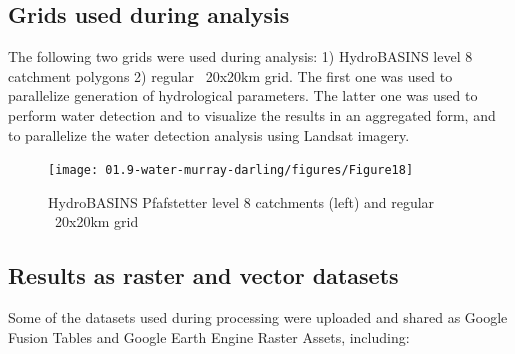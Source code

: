 \subsection{Grids used during analysis}

The following two grids were used during analysis: 1) HydroBASINS level 8 catchment polygons 2) regular ~20x20km grid. The first one was used to parallelize generation of hydrological parameters. The latter one was used to perform water detection and to visualize the results in an aggregated form, and to parallelize the water detection analysis using Landsat imagery.

\begin{figure}
	\centering
	\texttt{[image: 01.9-water-murray-darling/figures/Figure18]}
	\caption{HydroBASINS Pfafstetter level 8 catchments (left) and regular ~20x20km grid}
\end{figure}

\subsection{Results as raster and vector datasets}

Some of the datasets used during processing were uploaded and shared as Google Fusion Tables and Google Earth Engine Raster Assets, including:


\begin{table}
	\centering
	\caption{List of vector and raster datasets available online}
	\label{table:au-datasets-output}
	\small
{}
\end{table}

